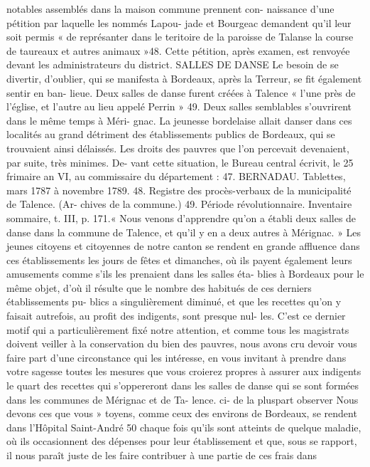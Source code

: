 \documentclass[a4paper,11pt]{book}
\begin{document}
notables assemblés dans la maison commune prennent con-
naissance d'une pétition par laquelle les nommés Lapou-
jade et Bourgeac demandent qu'il leur soit permis « de
représanter dans le teritoire de la paroisse de Talanse la
course de taureaux et autres animaux »48.
Cette pétition, après examen, est renvoyée devant les
administrateurs du district.
SALLES DE DANSE
Le besoin de se divertir, d'oublier, qui se manifesta à
Bordeaux, après la Terreur, se fit également sentir en ban-
lieue. Deux salles de danse furent créées à Talence « l'une
près de l'église, et l'autre au lieu appelé Perrin » 49. Deux
salles semblables s'ouvrirent dans le même temps à Méri-
gnac.
La jeunesse bordelaise allait danser dans ces localités au
grand détriment des établissements publics de Bordeaux,
qui se trouvaient ainsi délaissés. Les droits des pauvres
que l'on percevait devenaient, par suite, très minimes. De-
vant cette situation, le Bureau central écrivit, le 25 frimaire
an VI, au commissaire du département :
47. BERNADAU. Tablettes, mars 1787 à novembre 1789.
48. Registre des procès-verbaux de la municipalité de
Talence. (Ar-
chives de la commune.)
49. Période révolutionnaire. Inventaire sommaire, t. III, p. 171.« Nous
venons d'apprendre qu'on a établi deux salles
de danse dans la commune de Talence, et qu'il y en a deux
autres à Mérignac.
» Les jeunes citoyens et citoyennes de notre canton se
rendent en grande affluence dans ces établissements les
jours de fêtes et dimanches, où ils payent également leurs
amusements comme s'ils les prenaient dans les salles éta-
blies à Bordeaux pour le même objet, d'où il résulte que
le nombre des habitués de ces derniers établissements pu-
blics a singulièrement diminué, et que les recettes qu'on y
faisait autrefois, au profit des indigents, sont presque nul-
les. C'est ce dernier motif qui a particulièrement fixé notre
attention, et comme tous les magistrats doivent veiller à la
conservation du bien des pauvres, nous avons cru devoir
vous faire part d'une circonstance qui les intéresse, en vous
invitant à prendre dans votre sagesse toutes les mesures
que vous croierez propres à assurer aux indigents le quart
des recettes qui s'oppereront dans les salles de danse qui
se sont formées dans les communes de Mérignac et de Ta-
lence.
ci-
de
la
pluspart
observer
Nous
devons
ces
que
vous
»
toyens, comme ceux des environs de Bordeaux, se rendent
dans l'Hôpital Saint-André 50 chaque fois qu'ils sont atteints
de quelque maladie, où ils occasionnent des dépenses pour
leur établissement et que, sous se rapport, il nous paraît
juste de les faire contribuer à une partie de ces frais dans
\end{document}
